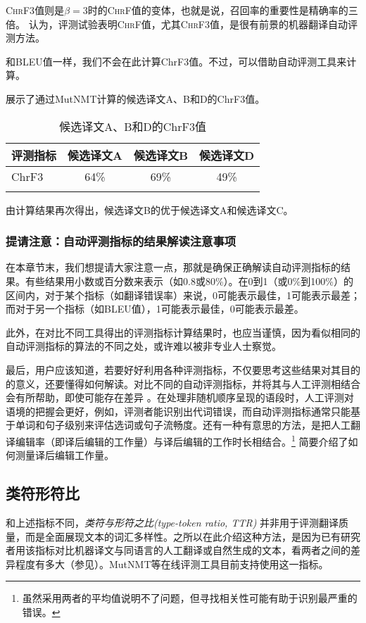 \documentclass[output=paper]{langscibook}
\begin{document}
\textsc{ChrF3}值则是$\beta = 3$时的\textsc{ChrF}值的变体，也就是说，召回率的重要性是精确率的三倍。 \citet{Popović2015}认为，评测试验表明\textsc{ChrF}值，尤其\textsc{ChrF3}值，是很有前景的机器翻译自动评测方法。

和BLEU值一样，我们不会在此计算ChrF3值。不过，可以借助自动评测工具来计算。

展示了通过MutNMT计算的候选译文A、B和D的ChrF3值。

\begin{table}
\begin{tabular}{lccc}
\lsptoprule
{评测指标} & {候选译文A} & {候选译文B} & {候选译文D}\\
\midrule
ChrF3 & 64\% & 69\% & 49\%\\
\lspbottomrule
\end{tabular}
\caption{候选译文A、B和D的ChrF3值\label{tab:rossi:14}}
\end{table}

由计算结果再次得出，候选译文B的优于候选译文A和候选译文C。


\subsubsection{提请注意：自动评测指标的结果解读注意事项}

在本章节末，我们想提请大家注意一点，那就是确保正确解读自动评测指标的结果。有些结果用小数或百分数来表示（如0.8或80\%）。在0到1（或0\%到100\%）的区间内，对于某个指标（如翻译错误率）来说，0可能表示最佳，1可能表示最差；而对于另一个指标（如BLEU值），1可能表示最佳，0可能表示最差。

此外，在对比不同工具得出的评测指标计算结果时，也应当谨慎，因为看似相同的自动评测指标的算法的不同之处，或许难以被非专业人士察觉。

最后，用户应该知道，若要好好利用各种评测指标，不仅要思考这些结果对其目的的意义，还要懂得如何解读。对比不同的自动评测指标，并将其与人工评测相结合会有所帮助，即使可能存在差异 \citep[134]{Doherty2017}。在处理非随机顺序呈现的语段时，人工评测对语境的把握会更好，例如，评测者能识别出代词错误，而自动评测指标通常只能基于单词和句子级别来评估选词或句子流畅度。还有一种有意思的方法，是把人工翻译编辑率（即译后编辑的工作量）与译后编辑的工作时长相结合。\footnote{虽然采用两者的平均值说明不了问题，但寻找相关性可能有助于识别最严重的错误。}  简要介绍了如何测量译后编辑工作量。


\subsection{类符形符比}
和上述指标不同，\textit{类符与形符之比(type-token ratio, TTR)} 并非用于评测翻译质量，而是全面展现文本的词汇多样性。之所以在此介绍这种方法，是因为已有研究者用该指标对比机器译文与同语言的人工翻译或自然生成的文本，看两者之间的差异程度有多大（参见\citealt{Toral2019}）。MutNMT等在线评测工具目前支持使用这一指标。
\end{document}
